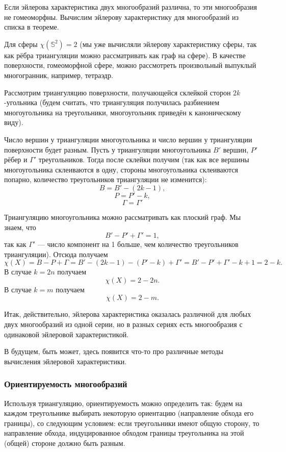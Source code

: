 Если эйлерова характеристика двух многообразий различна, то эти многообразия не гомеоморфны. Вычислим эйлерову характеристику для многообразий из списка в теореме.

Для сферы $\chi(\mathbb{S}^2) = 2$ (мы уже вычисляли эйлерову характеристику сферы, так как рёбра триангуляции можно рассматривать как граф на сфере). В качестве поверхности, гомеоморфной сфере, можно рассмотреть произвольный выпуклый многогранник, например, тетраэдр.

Рассмотрим триангуляцию поверхности, получающейся склейкой сторон $2k$-угольника (будем считать, что триангуляция получилась разбиением многоугольника на треугольники, многоугольник приведён к каноническому виду).

Число вершин у триангуляции многоугольника и число вершин у триангуляции поверхности будет разным. Пусть у триангуляции многоугольника $B'$ вершин, $P'$ рёбер и $\Gamma'$ треугольников. Тогда после склейки получим (так как все вершины многоугольника склеиваются в одну, стороны многоугольника склеиваются попарно, количество треугольников триангуляции не изменится):
\[B = B' - (2k - 1),\]
\[P = P' - k,\]
\[\Gamma = \Gamma'\]

Триангуляцию многоугольника можно рассматривать как плоский граф. Мы знаем, что 
\[B' - P' + \Gamma' = 1,\]
так как $\Gamma'$ — число компонент на 1 больше, чем количество треугольников триангуляции). Отсюда получаем
\[\chi(X) = B - P + \Gamma = B' - (2k - 1) - (P' - k) + \Gamma' = B' - P' + \Gamma' - k + 1 = 2 - k.\]
В случае $k = 2n$ получаем \[\chi(X) = 2 - 2n.\]
В случае $k = m$ получаем \[\chi(X) = 2 - m.\]

Итак, действительно, эйлерова характеристика оказалась различной для любых двух многообразий из одной серии, но в разных сериях есть многообразия с одинаковой эйлеровой характеристикой.

В будущем, быть может, здесь появится что-то про различные методы вычисления эйлеровой характеристики.


\subsubsection{Ориентируемость многообразий}
Используя триангуляцию, ориентируемость можно определить так: будем на каждом треугольнике выбирать некоторую ориентацию (направление обхода его границы), со следующим условием: если треугольники имеют общую сторону, то направление обхода, индуцированное обходом границы треугольника на этой (общей) стороне должно быть разным.

